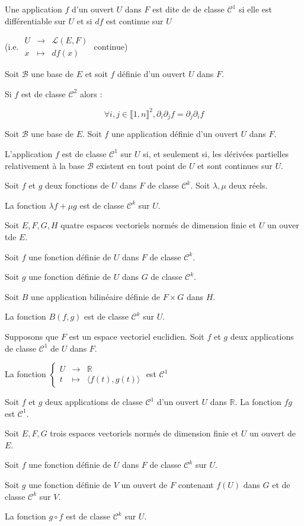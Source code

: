 \documentclass[a4paper,12pt]{book}
\newcommand{\Def}[2]{\begin{tcolorbox}[colback=white,colframe=red!10!green!20!blue!75!, title=Définition : #1]#2\end{tcolorbox}}
\newcommand{\Thr}[2]{\begin{tcolorbox}[sharp corners, colback=white,colframe=red!10!blue!30!green!75!, title=Théorème : #1]#2\end{tcolorbox}}
\def\R{\mathbb{R}}
\begin{document}
\Def{}{Une application $f$ d'un ouvert $U$ dans $F$ est dite de de classe $\mathcal{C}^1$ si elle est différentiable sur $U$ et si $df$ est continue sur $U$
\par (i.e. $\begin{array}{rcl} U & \to & \mathcal{L}(E,F) \\ x & \mapsto & df(x)\end{array}$ continue)}
\Thr{de Schwarz}{Soit $\mathcal{B}$ une base de $E$ et soit $f$ définie d'un ouvert $U$ dans $F$.
\par Si $f$ est de classe $\mathcal{C}^2$ alors :
\par $$\forall i,j\in\llbracket 1, n\rrbracket^2, \partial_i\partial_jf = \partial_j\partial_if$$}
\Thr{}{Soit $\mathcal{B}$ une base de $E$. Soit $f$ une application définie d'un ouvert $U$ dans $F$.
\par L'application $f$ est de classe $\mathcal{C}^1$ sur $U$ si, et seulement si, les dérivées partielles relativement à la base $\mathcal{B}$ existent en tout point de $U$ et sont continues sur $U$.}
\Thr{Classe d'une combinaison linéaire}{Soit $f$ et $g$ deux fonctions de $U$ dans $F$ de classe $\mathcal{C}^k$. Soit $\lambda, \mu$ deux réels.
\par La fonction $\lambda f+\mu g$ est de classe $\mathcal{C}^k$ sur $U$.}
\Thr{Classe d'une application bilinéaire}{Soit $E,F,G,H$ quatre espaces vectoriels normés de dimension finie et $U$ un ouver tde $E$.
\par Soit $f$ une fonction définie de $U$ dans $F$ de classe $\mathcal{C}^k$.
\par Soit $g$ une fonction définie de $U$ dans $G$ de classe $\mathcal{C}^k$.
\par Soit $B$ une application bilinéaire définie de $F\times G$ dans $H$.
\par La fonction $B(f, g)$ est de classe $\mathcal{C}^k$ sur $U$.}
\Thr{Classe d'un produit scalaire}{Supposons que $F$ est un espace vectoriel euclidien. Soit $f$ et $g$ deux applications de classe $\mathcal{C}^1$ de $U$ dans $F$.
\par La fonction $\left\{\begin{array}{rcl} U & \to & \R \\ t & \mapsto & \langle f(t), g(t)\rangle\end{array}\right.$ est $\mathcal{C}^1$}
\Thr{Classe d'un produit}{Soit $f$ et $g$ deux applications de classe $\mathcal{C}^1$ d'un ouvert $U$ dans $\R$. La fonction $fg$ est $\mathcal{C}^1$.}
\Thr{Classe d'une composée}{Soit $E, F,G$ trois espaces vectoriels normés de dimension finie et $U$ un ouvert de $E$.
\par Soit $f$ une fonction définie de $U$ dans $F$ de classe $\mathcal{C}^k$ sur $U$.
\par Soit $g$ une fonction définie de $V$ un ouvert de $F$ contenant $f(U)$ dans $G$ et de classe $\mathcal{C}^k$ sur $V$.
\par La fonction $g\circ f$ est de classe $\mathcal{C}^k$ sur $U$.}
\end{document}
